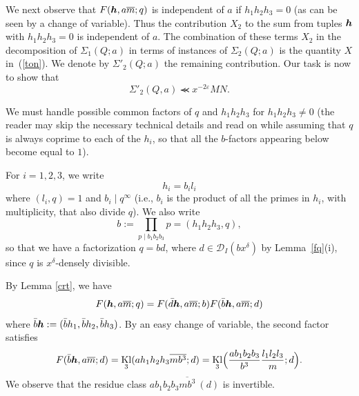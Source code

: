 \documentclass[12pt,a4paper,reqno]{amsart}
\numberwithin{equation}{section}
\DeclareMathOperator{\hypk}{Kl}
\theoremstyle{plain}
\theoremstyle{definition}
\newcommand\Z{\mathbb{Z}}
\newcommand\eps{\varepsilon}
\newcommand{\DIone}[2]{\mathcal{D}_{{#1}}({#2})}
\newcommand{\uple}[1]{\text{\boldmath${#1}$}}
\newcommand{\mods}[1]{\,(\mathrm{mod}\,{#1})}
\renewcommand{\lessapprox}{\llcurly}
\begin{document}

We next observe that $F(\uple{h}, a \overline{m}; q)$ is independent
of $a$ if $h_1h_2h_3=0$ (as can be seen by a change of variable). Thus
the contribution $X_2$ to the sum from tuples $\uple{h}$ with
$h_1h_2h_3=0$ is independent of $a$. The combination of these terms
$X_2$ in the decomposition of $\Sigma_1(Q;a)$ in terms of instances of
$\Sigma_2(Q;a)$ is the quantity $X$ in~(\ref{ton}). We denote by
$\Sigma'_2(Q;a)$ the remaining contribution.  Our task is now to show that
\begin{equation}\label{sqa}
\Sigma'_2(Q,a) \lessapprox x^{-2\eps} MN.
\end{equation}

We must handle possible common factors of $q$ and $h_1h_2h_3$ for
$h_1h_2h_3\neq 0$ (the reader may skip the necessary technical details
and read on while assuming that $q$ is always coprime to each of the
$h_i$, so that all the $b$-factors appearing below become equal to $1$).  

For $i=1,2,3$, we write
$$
h_i=b_il_i
$$ 
where $(l_i,q)=1$ and $b_i\mid q^{\infty}$ (i.e., $b_i$ is the product
of all the primes in $h_i$, with multiplicity, that also divide
$q$). We also write
\begin{equation}\label{eq-b}
  b :=\prod_{p\mid b_1b_2b_3}p= (h_1h_2h_3,q),
\end{equation}
so that we have a factorization $q=bd$, where $d\in
\DIone{I}{bx^{\delta}}$ by Lemma~\ref{fq}(i), since $q$ is
$x^\delta$-densely divisible. 

By Lemma \ref{crt}, we have 
$$ 
F( \uple{h}, a \overline{m}; q) = F( \bar{d}\uple{h}, a \overline{m};
b) F( \bar{b}\uple{h}, a \overline{m}; d)
$$
where $\bar{b}\uple{h} := (\bar{b}h_1, \bar{b}h_2, \bar{b}h_3)$.
By an easy change of variable, the second factor satisfies
$$
F( \bar{b}\uple{h}, a \overline{m}; d) =\hypk_3 ( a h_1 h_2 h_3
\overline{mb^3}; d )= \hypk_3\Bigl( \frac{ab_1b_2b_3}{b^3}
\frac{l_1l_2l_3}{m};d\Bigr).
$$
We observe that the residue class $ab_1b_2b_3\overline{mb^3}\ (d)$ is
invertible.
\end{document}
